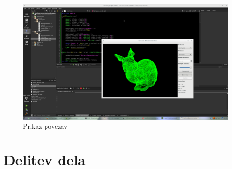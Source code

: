 \documentclass[11pt]{article}
\begin{document}
\begin{figure}[htb]
    \centering
    \includegraphics[width=\textwidth]{lines.png}
    \caption{Prikaz povezav}
    \label{fig:edges}
\end{figure}

\section{Delitev dela}
\end{document}
